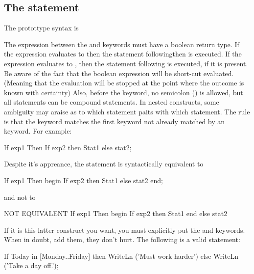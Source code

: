 \documentclass{report}
\begin{document}
\subsection{The  statement}
The  protottype syntax is

The expression between the  and  keywords must have a
boolean return type. If the expression evaluates to  then the 
statement following{then} is executed. If the expression evaluates to 
, then the statement following  is executed, if it is
present.
Be aware of the fact that the boolean expression will be short-cut evaluated. 
(Meaning that the evaluation will be stopped at the point where the
 outcome is known with certainty)
Also, before the  keyword,  no semicolon (\var{;}) is allowed,
but all statements can be compound statements.
In nested  constructs, some ambiguity may araise as
to which   statement paits with which  statement. The rule
is that the  keyword matches the first  keyword not
already matched by an  keyword.
For example:
\begin{listing}
If exp1 Then 
  If exp2 then 
    Stat1 
else 
  stat2;
\end{listing}
Despite it's appreance, the statement is syntactically equivalent to
\begin{listing}
If exp1 Then
   begin 
   If exp2 then 
      Stat1 
   else 
      stat2
   end;
\end{listing}
and not to 
\begin{listing}
{ NOT EQUIVALENT }
If exp1 Then
   begin 
   If exp2 then 
      Stat1 
   end
else 
   stat2
\end{listing}
If it is this latter construct you want, you must explicitly put the
 and  keywords. When in doubt, add them, they don't
hurt.
The following is a valid statement:
\begin{listing}
If Today in [Monday..Friday] then
  WriteLn ('Must work harder')
else
  WriteLn ('Take a day off.');
\end{listing}
\end{document}
